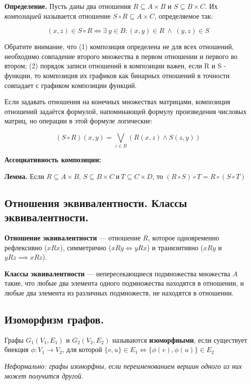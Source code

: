 \documentclass[a4paper, 10pt]{article}
\begin{document}
\textbf{Определение.} Пусть даны два отношения $R \subseteq A \times B$ и $S \subseteq B \times C$. Их \textit{композицией} называется отношение $S \circ R \subseteq A \times C$, определяемое так:

$$(x, z) \in S \circ R \Longleftrightarrow \exists \ y \in B \colon (x, y) \in R \ \wedge \ (y, z) \in S$$

Обратите внимание, что (1) композиция определена не для всех отношений, необходимо совпадение второго множества в первом отношении и первого во втором; (2) порядок записи отношений в композиции важен, если R и S - функции, то композиция их графиков как бинарных отношений в точности совпадает с графиком композиции функций.

Если задавать отношения на конечных множествах матрицами, композиция отношений задаётся формулой, напоминающей формулу произведения числовых матриц, но операции в этой формуле логические:

$$\displaystyle (S \circ R)(x, y) = \bigvee_{z \in B}(R(x, z) \wedge S(z, y))$$

\textbf{Ассоциативность композиции:}

\textbf{Лемма.} Если $R \subseteq A \times B, \, S \subseteq B \times C \ \text{и} \ T \subseteq C \times D$, то $(R \circ S) \circ T = R \circ (S \circ T)$


\subsection{Отношения эквивалентности. Классы эквивалентности.}

\textbf{Отношение эквивалентности} --- отношение $R$, которое одновременно рефлексивно ($xRx$), симметрично ($xRy \iff yRx$) и транизитивно ($xRy$ и $yRz \implies xRz$).

\textbf{Классы эквивалентности} --- непересекающиеся подмножества множества $A$ такие, что любые два элемента одного подмножества находятся в отношении, и любые два элемента из различных подмножеств, не находятся в отношении.


\subsection{Изоморфизм графов.}

Графы $G_1(V_1,E_1)$ и $G_2(V_2,E_2)$ называются \textbf{изоморфными}, если существует биекция $\phi \colon V_1 \to V_2$, для которой $\{v,u\} \in E_1 \iff \{\phi(v),\phi(u)\} \in E_2$

\textit{Неформально: графы изоморфны, если переименованием вершин одного из них может получится другой.}
\end{document}
